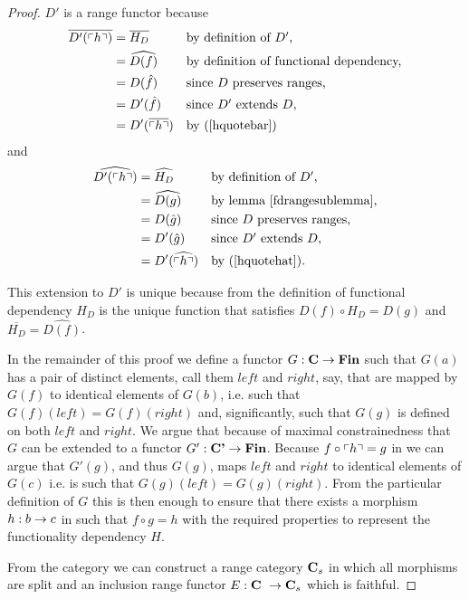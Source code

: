 \begin{proof}
$D'$ is a range functor because
\begin{align*}
\overline{D'(\left\ulcorner h\right\urcorner)}&= \overline{H_D} && \mbox{by definition of $D'$,}  \\
                     &= \widehat{D(f)} && \mbox{by definition of functional dependency,} \\
                     &= D(\hat{f})     && \mbox{since $D$ preserves ranges,} \\
                     &= D'(\hat{f})     && \mbox{since $D'$ extends $D$,} \\
                     &= D'(\overline{\left\ulcorner h\right\urcorner}) && \mbox{by (\ref{hquotebar})}
\end{align*}
and 
\begin{align*}
\widehat{D'(\left\ulcorner h\right\urcorner)}&= \widehat{H_D}       && \mbox{by definition of $D'$,}  \\
                    &= \widehat{D(g)}      && \mbox{by lemma \ref{fdrangesublemma},}   \\
                    &= D(\hat{g})          && \mbox{since $D$ preserves ranges,}   \\
                    &= D'(\hat{g})         && \mbox{since $D'$ extends $D$, } \\
                    &=D'(\widehat{\left\ulcorner h\right\urcorner}) && \mbox{by (\ref{hquotehat}).}
\end{align*}

This extension to $D'$ is unique because from the definition of functional dependency
$H_D$ is the unique function 
that satisfies $D(f) \circ H_D = D(g)$ and $\overline{H_D}=\widehat{D(f)}$.

In the remainder of this proof 
we define a functor $G: \textbf{C} \rightarrow \textbf{Fin}$ such that
$G(a)$ has a pair of distinct elements, call them $left$ and $right$, say,  that are mapped by $G(f)$ to identical elements
of $G(b)$, i.e. such that $G(f)(left)= G(f)(right)$ and, significantly,
such that $G(g)$ is defined on both $left$ and $right$.   
We  argue that because of  maximal constrainedness that $G$ can be extended to a functor 
$G' : \textbf{C'} \rightarrow \textbf{Fin}$. 
Because $f \circ \left\ulcorner h\right\urcorner = g$ in \catcpw we can argue that $G'(g)$,
and thus $G(g)$,
maps $left$ and $right$ to identical elements of $G(c)$ 
i.e. is such that $G(g)(left)= G(g)(right)$. 
From the particular definition of $G$ this  is then enough 
to ensure that there exists a morphism $h:b \rightarrow c$ in \catcw
such that $f \circ g = h$
 with the required properties to represent the functionality dependency $H$.

From the \rangeplus category \catcw we can  construct a range category $\textbf{C}_s$ in which all morphisms are split and an inclusion range functor $E: \textbf{C}\  \rightarrow \textbf{C}_s$ which is faithful.   


\end{proof}
